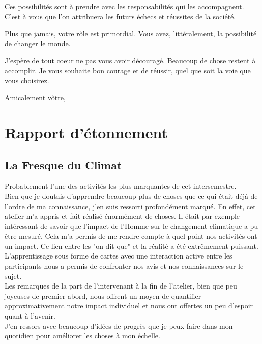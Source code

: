 {Ces possibilités sont à prendre avec les responsabilités qui les accompagnent. C'est à vous que l'on attribuera les futurs échecs et réussites de la société.

Plus que jamais, votre rôle est primordial. Vous avez, littéralement, la possibilité de changer le monde.

J'espère de tout coeur ne pas vous avoir découragé. Beaucoup de chose restent à accomplir.
Je vous souhaite bon courage et de réussir, quel que soit la voie que vous choisirez.

Amicalement vôtre,



\chapter{Rapport d'étonnement}

\newcommand{\pd}{Petits Débrouillards }

\section{La Fresque du Climat}

Probablement l'une des activités les plus marquantes de cet intersemestre.\\

Bien que je doutais d'apprendre beaucoup plus de choses que ce qui était déjà de l'ordre de ma connaissance, j'en suis ressorti profondément marqué. En effet, cet atelier m'a appris et fait réalisé énormément de choses.
Il était par exemple intéressant de savoir que l'impact de l'Homme sur le changement climatique a pu être mesuré. Cela m'a permis de me rendre compte à quel point nos activités ont un impact. Ce lien entre les "on dit que" et la réalité a été extrêmement puissant.\\

L'apprentissage sous forme de cartes avec une interaction active entre les participants nous a permis de confronter nos avis et nos connaissances sur le sujet. \\

Les remarques de la part de l'intervenant à la fin de l'atelier, bien que peu joyeuses de premier abord, nous offrent un moyen de quantifier approximativement notre impact individuel et nous ont offertes un peu d'espoir quant à l'avenir.\\

J'en ressors avec beaucoup d'idées de progrès que je peux faire dans mon quotidien pour améliorer les choses à mon échelle.

}
